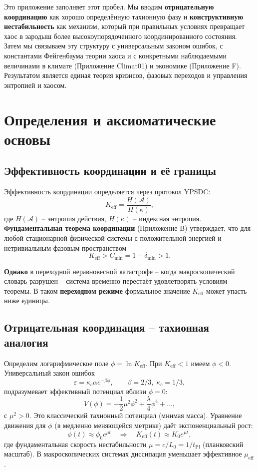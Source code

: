 \documentclass[12pt,a4paper]{article}
\newcommand{\Keff}{K_{\mathrm{eff}}}
\begin{document}
	Это приложение заполняет этот пробел. Мы вводим \textbf{отрицательную координацию} как
	хорошо определённую тахионную фазу и \textbf{конструктивную нестабильность} как механизм,
	который при правильных условиях превращает хаос в зародыш более высокоупорядоченного
	координированного состояния. Затем мы связываем эту структуру с универсальным законом ошибок,
	с константами Фейгенбаума теории хаоса и с конкретными наблюдаемыми величинами в климате
	(Приложение Climat01) и экономике (Приложение F). Результатом является единая теория кризисов,
	фазовых переходов и управления энтропией и хаосом.
	
	\section{Определения и аксиоматические основы}
	
	\subsection{Эффективность координации и её границы}
	
	Эффективность координации определяется через протокол YPSDC:
	\[
	\Keff = \frac{H(\mathcal{A})}{H(\kappa)},
	\]
	где $H(\mathcal{A})$ – энтропия действия, $H(\kappa)$ – индексная энтропия.
	\textbf{Фундаментальная теорема координации} (Приложение B) утверждает, что для любой
	стационарной физической системы с положительной энергией и нетривиальным фазовым пространством
	\[
	\Keff > C_{\min} = 1 + \delta_{\min} > 1.
	\]
	
	\textbf{Однако} в переходной неравновесной катастрофе – когда макроскопический словарь
	разрушен – система временно перестаёт удовлетворять условиям теоремы. В таком
	\textbf{переходном режиме} формальное значение $\Keff$ может упасть ниже единицы.
	
	\subsection{Отрицательная координация – тахионная аналогия}
	
	Определим логарифмическое поле $\phi = \ln \Keff$. При $\Keff < 1$ имеем $\phi < 0$.
	Универсальный закон ошибок
	\[
	\varepsilon = \kappa_c \alpha e^{-\beta \phi}, \qquad \beta = 2/3,\; \kappa_c = 1/3,
	\]
	подразумевает эффективный потенциал вблизи $\phi = 0$:
	\[
	V(\phi) = -\frac{1}{2}\mu^2 \phi^2 + \frac{\lambda}{4}\phi^4 + \dots,
	\]
	с $\mu^2 > 0$. Это классический тахионный потенциал (мнимая масса).
	Уравнение движения для $\phi$ (в медленно меняющейся метрике) даёт экспоненциальный рост:
	\[
	\phi(t) \approx \phi_0 e^{\mu t} \quad\Longrightarrow\quad \Keff(t) \approx K_0 e^{\mu t},
	\]
	где фундаментальная скорость нестабильности $\mu = c/L_0 = 1/t_{\mathrm{Pl}}$ (планковский масштаб).
	В макроскопических системах диссипация уменьшает эффективное $\mu_{\mathrm{eff}}$.
	
\end{document}
